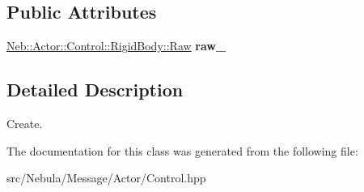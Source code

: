 \subsection*{\-Public \-Attributes}
\begin{DoxyCompactItemize}
\item 
\hypertarget{classNeb_1_1Message_1_1Actor_1_1Control_1_1RigidBody_1_1Create_a14e77739ef573690efb085293bd3a4f8}{\hyperlink{classNeb_1_1Actor_1_1Control_1_1RigidBody_1_1Raw}{\-Neb\-::\-Actor\-::\-Control\-::\-Rigid\-Body\-::\-Raw} {\bfseries raw\-\_\-}}\label{classNeb_1_1Message_1_1Actor_1_1Control_1_1RigidBody_1_1Create_a14e77739ef573690efb085293bd3a4f8}

\end{DoxyCompactItemize}


\subsection{\-Detailed \-Description}
\-Create. 

\-The documentation for this class was generated from the following file\-:\begin{DoxyCompactItemize}
\item 
src/\-Nebula/\-Message/\-Actor/\-Control.\-hpp\end{DoxyCompactItemize}
